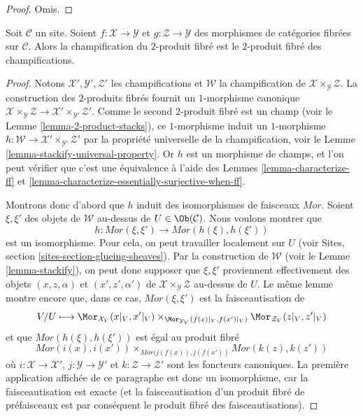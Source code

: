 \begin{proof}
Omis.
\end{proof}

\begin{lemma}
\label{lemma-stackification-fibre-product-fibred-categories}
Soit $\mathcal{C}$ un site.
Soient $f : \mathcal{X} \to \mathcal{Y}$ et $g : \mathcal{Z} \to \mathcal{Y}$
des morphismes de catégories fibrées sur $\mathcal{C}$.
Alors la champification du $2$-produit fibré est le $2$-produit
fibré des champifications.
\end{lemma}

\begin{proof}
Notons $\mathcal{X}', \mathcal{Y}', \mathcal{Z}'$ les champifications
et $\mathcal{W}$ la champification de
$\mathcal{X} \times_\mathcal{Y} \mathcal{Z}$. La construction des $2$-produits
fibrés fournit un $1$-morphisme canonique
$\mathcal{X} \times_\mathcal{Y} \mathcal{Z} \to
\mathcal{X}' \times_{\mathcal{Y}'} \mathcal{Z}'$.
Comme le second $2$-produit fibré est un champ (voir le
Lemme \ref{lemma-2-product-stacks}),
ce $1$-morphisme induit un $1$-morphisme
$h : \mathcal{W} \to \mathcal{X}' \times_{\mathcal{Y}'} \mathcal{Z}'$
par la propriété universelle de la champification, voir le
Lemme \ref{lemma-stackify-universal-property}.
Or $h$ est un morphisme de champs, et l'on peut vérifier que c'est une
équivalence à l'aide des
Lemmes \ref{lemma-characterize-ff} et
\ref{lemma-characterize-essentially-surjective-when-ff}.

\medskip\noindent
Montrons donc d'abord que $h$ induit des isomorphismes de faisceaux $\mathit{Mor}$.
Soient $\xi, \xi'$ des objets de $\mathcal{W}$ au-dessus de
$U \in \Ob(\mathcal{C})$. Nous voulons montrer que
$$
h : \mathit{Mor}(\xi, \xi') \longrightarrow \mathit{Mor}(h(\xi), h(\xi'))
$$
est un isomorphisme. Pour cela, on peut travailler localement sur $U$ (voir
Sites, section \ref{sites-section-glueing-sheaves}).
Par la construction de $\mathcal{W}$ (voir le
Lemme \ref{lemma-stackify}),
on peut donc supposer que $\xi, \xi'$ proviennent effectivement
des objets $(x, z, \alpha)$ et $(x', z', \alpha')$
de $\mathcal{X} \times_\mathcal{Y} \mathcal{Z}$ au-dessus de $U$.
Le même lemme montre encore que, dans ce cas,
$\mathit{Mor}(\xi, \xi')$ est la faisceautisation de
$$
V/U \longmapsto
\Mor_{\mathcal{X}_V}(x|_V, x'|_V)
\times_{\Mor_{\mathcal{Y}_V}(f(x)|_V, f(x')|_V)}
\Mor_{\mathcal{Z}_V}(z|_V, z'|_V)
$$
et que $\mathit{Mor}(h(\xi), h(\xi'))$ est égal au produit fibré
$$
\mathit{Mor}(i(x), i(x'))
\times_{\mathit{Mor}(j(f(x)), j(f(x'))}
\mathit{Mor}(k(z), k(z'))
$$
où $i : \mathcal{X} \to \mathcal{X}'$,
$j : \mathcal{Y} \to \mathcal{Y}'$ et
$k : \mathcal{Z} \to \mathcal{Z}'$ sont les foncteurs canoniques.
La première application affichée de ce paragraphe est donc un isomorphisme, car
la faisceautisation est exacte (et la faisceautisation d'un produit fibré
de préfaisceaux est par conséquent le produit fibré des faisceautisations).


\end{proof}
